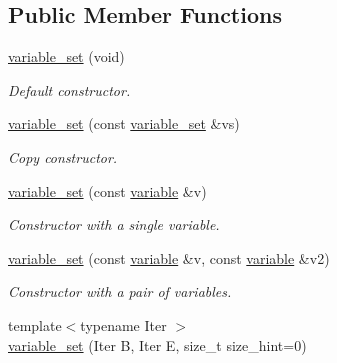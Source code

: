 \subsection*{Public Member Functions}
\begin{DoxyCompactItemize}
\item 
\hyperlink{classmerlin_1_1variable__set_a7fd347efce6f30df0344d20d466c0deb}{variable\+\_\+set} (void)\hypertarget{classmerlin_1_1variable__set_a7fd347efce6f30df0344d20d466c0deb}{}\label{classmerlin_1_1variable__set_a7fd347efce6f30df0344d20d466c0deb}

\begin{DoxyCompactList}\small\item\em Default constructor. \end{DoxyCompactList}\item 
\hyperlink{classmerlin_1_1variable__set_a877cc4b44d4c9ff4bc809fc896b8d879}{variable\+\_\+set} (const \hyperlink{classmerlin_1_1variable__set}{variable\+\_\+set} \&vs)\hypertarget{classmerlin_1_1variable__set_a877cc4b44d4c9ff4bc809fc896b8d879}{}\label{classmerlin_1_1variable__set_a877cc4b44d4c9ff4bc809fc896b8d879}

\begin{DoxyCompactList}\small\item\em Copy constructor. \end{DoxyCompactList}\item 
\hyperlink{classmerlin_1_1variable__set_ad89aea5338a27f742fe1e6289abe133e}{variable\+\_\+set} (const \hyperlink{classmerlin_1_1variable}{variable} \&v)\hypertarget{classmerlin_1_1variable__set_ad89aea5338a27f742fe1e6289abe133e}{}\label{classmerlin_1_1variable__set_ad89aea5338a27f742fe1e6289abe133e}

\begin{DoxyCompactList}\small\item\em Constructor with a single variable. \end{DoxyCompactList}\item 
\hyperlink{classmerlin_1_1variable__set_a38d633c846218d2afa0bcc62d72c13d6}{variable\+\_\+set} (const \hyperlink{classmerlin_1_1variable}{variable} \&v, const \hyperlink{classmerlin_1_1variable}{variable} \&v2)\hypertarget{classmerlin_1_1variable__set_a38d633c846218d2afa0bcc62d72c13d6}{}\label{classmerlin_1_1variable__set_a38d633c846218d2afa0bcc62d72c13d6}

\begin{DoxyCompactList}\small\item\em Constructor with a pair of variables. \end{DoxyCompactList}\item 
{\footnotesize template$<$typename Iter $>$ }\\\hyperlink{classmerlin_1_1variable__set_a91672ff5a3b7711e032d9ac58332fce2}{variable\+\_\+set} (Iter B, Iter E, size\+\_\+t size\+\_\+hint=0)\hypertarget{classmerlin_1_1variable__set_a91672ff5a3b7711e032d9ac58332fce2}{}\label{classmerlin_1_1variable__set_a91672ff5a3b7711e032d9ac58332fce2}


\end{DoxyCompactItemize}
